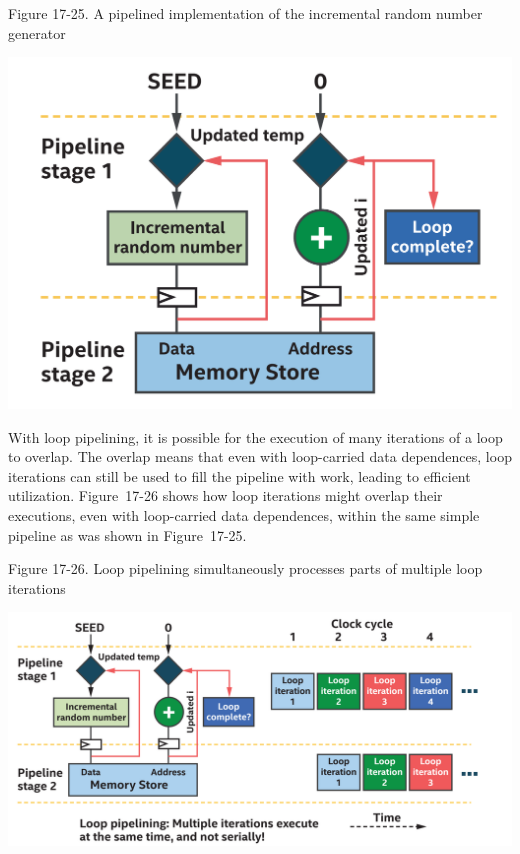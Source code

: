 \hspace*{\fill} \par %
Figure 17-25. A pipelined implementation of the incremental random number generator
\begin{center}
	\includegraphics[width=1.0\textwidth]{content/chapter-17/images/20}
\end{center}

With loop pipelining, it is possible for the execution of many iterations of a loop to overlap. The overlap means that even with loop-carried data dependences, loop iterations can still be used to fill the pipeline with work, leading to efficient utilization. Figure 17-26 shows how loop iterations might overlap their executions, even with loop-carried data dependences, within the same simple pipeline as was shown in Figure 17-25.\par

\hspace*{\fill} \par %
Figure 17-26. Loop pipelining simultaneously processes parts of multiple loop iterations
\begin{center}
	\includegraphics[width=1.0\textwidth]{content/chapter-17/images/21}
\end{center}


